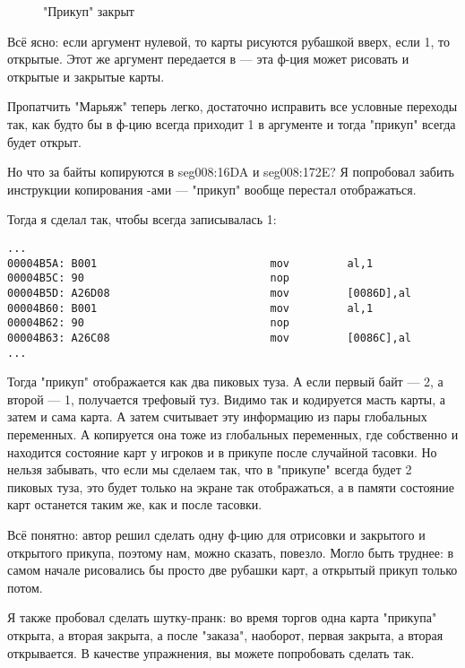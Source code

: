 \begin{figure}[H]
\centering
{}
\caption{"Прикуп" закрыт}
\end{figure}

Всё ясно: если аргумент  нулевой, то карты рисуются рубашкой вверх, если 1, то открытые.
Этот же аргумент передается в  --- эта ф-ция может рисовать и открытые и закрытые карты.

Пропатчить "Марьяж" теперь легко, достаточно исправить все условные переходы так, как будто бы в ф-цию
всегда приходит 1 в аргументе и тогда "прикуп" всегда будет открыт.

Но что за байты копируются в seg008:16DA и seg008:172E?
Я попробовал забить инструкции копирования \MOV \NOP{}-ами --- "прикуп" вообще перестал отображаться.

Тогда я сделал так, чтобы всегда записывалась 1:

\begin{lstlisting}[style=customasmx86]
...
00004B5A: B001                           mov         al,1
00004B5C: 90                             nop
00004B5D: A26D08                         mov         [0086D],al
00004B60: B001                           mov         al,1
00004B62: 90                             nop
00004B63: A26C08                         mov         [0086C],al
...
\end{lstlisting}

Тогда "прикуп" отображается как два пиковых туза.
А если первый байт --- 2, а второй --- 1, получается трефовый туз.
Видимо так и кодируется масть карты, а затем и сама карта.
А  затем считывает эту информацию из пары глобальных переменных.
А копируется она тоже из глобальных переменных, где собственно и находится состояние карт у игроков и в прикупе
после случайной тасовки.
Но нельзя забывать, что если мы сделаем так, что в "прикупе" всегда будет 2 пиковых туза, это будет только
на экране так отображаться, а в памяти состояние карт останется таким же, как и после тасовки.

Всё понятно: автор решил сделать одну ф-цию для отрисовки и закрытого и открытого прикупа, поэтому нам, можно сказать,
повезло.
Могло быть труднее: в самом начале рисовались бы просто две рубашки карт, а открытый прикуп только потом.

Я также пробовал сделать шутку-пранк: во время торгов одна карта "прикупа" открыта, а вторая закрыта, а после "заказа",
наоборот, первая закрыта, а вторая открывается. В качестве упражнения, вы можете попробовать сделать так.

